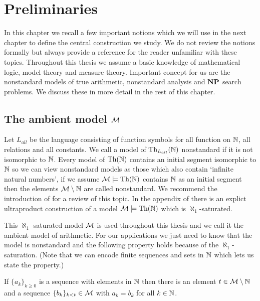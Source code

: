 \chapter*{Preliminaries}

In this chapter we recall a few important notions which we will use in the next chapter to define the central construction we study. We do not review the notions formally but always provide a reference for the reader unfamiliar with these topics. Throughout this thesis we assume a basic knowledge of mathematical logic, model theory and measure theory. Important concept for us are the nonstandard models of true arithmetic, nonstandard analysis and $\textbf{NP}$ search problems. We discuss these in more detail in the rest of this chapter.

\section*{The ambient model $\mathcal{M}$}

Let $L_{all}$ be the language consisting of function symbols for all function on $\mathbb{N}$, all relations and all constants. We call a model of $\text{Th}_{L_{all}}(\mathbb{N})$ nonstandard if it is not isomorphic to $\mathbb{N}$. Every model of $\text{Th}(\mathbb{N})$ contains an initial segment isomorphic to $\mathbb{N}$ so we can view nonstandard models as those which also contain `infinite natural numbers', if we assume $\mathcal{M}\models \text{Th}(\mathbb{N})$ contains $\mathbb{N}$ as an initial segment then the elements $\mathcal{M}\setminus \mathbb{N}$ are called nonstandard. We recommend the introduction of \cite{kaye1991pa} for a review of this topic. In the appendix of \cite{krajicek2010forcing} there is an explict ultraproduct construction of a model $\mathcal{M}\models \text{Th}(\mathbb{N})$ which is $\aleph_1$-saturated.

This $\aleph_1$-saturated model $\mathcal{M}$ is used throughout this thesis and we call it the ambient model of arithmetic. For our applications we just need to know that the model is nonstandard and the following property holds because of the $\aleph_1$-saturation. (Note that we can encode finite sequences and sets in $\mathbb{N}$ which lets us state the property.)

\begin{prope}
If $\{a_k\}_{k\geq 0}$ is a sequence with elements in $\mathbb{N}$ then there is an element $t\in \mathcal{M} \setminus \mathbb{N}$ and a sequence $\{b_k\}_{k<t}\in \mathcal{M}$ with $a_k=b_k$ for all $k\in \mathbb{N}$.
\end{prope}

